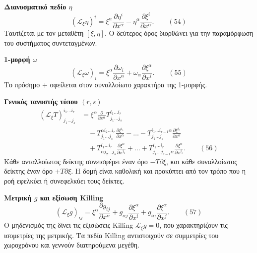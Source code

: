 \documentclass[12pt]{article}
\begin{document}
\textbf{Διανυσματικό πεδίο $\eta$}
\begin{equation}
(\mathcal{L}_\xi \eta)^i = \xi^\alpha \frac{\partial \eta^i}{\partial x^\alpha} - \eta^\alpha \frac{\partial \xi^i}{\partial x^\alpha}. \qquad (54)
\end{equation}
Ταυτίζεται με τον μεταθέτη $[\xi, \eta]$. Ο δεύτερος όρος διορθώνει για την παραμόρφωση του συστήματος συντεταγμένων.

\textbf{1-μορφή $\omega$}
\begin{equation}
(\mathcal{L}_\xi \omega)_i = \xi^\alpha \frac{\partial \omega_i}{\partial x^\alpha} + \omega_\alpha \frac{\partial \xi^\alpha}{\partial x^i}. \qquad (55)
\end{equation}
Το πρόσημο $+$ οφείλεται στον συναλλοίωτο χαρακτήρα της 1-μορφής.

\textbf{Γενικός τανυστής τύπου $(r, s)$}
\begin{equation}
\begin{aligned}
(\mathcal{L}_\xi T)^{i_1 \dots i_r}_{j_1 \dots j_s} &= \xi^\alpha \frac{\partial}{\partial x^\alpha} T^{i_1 \dots i_r}_{j_1 \dots j_s} \\
&\quad - T^{\alpha i_2 \dots i_r}_{j_1 \dots j_s} \frac{\partial \xi^{i_1}}{\partial x^\alpha} - \dots - T^{i_1 \dots i_{r-1} \alpha}_{j_1 \dots j_s} \frac{\partial \xi^{i_r}}{\partial x^\alpha} \\
&\quad + T^{i_1 \dots i_r}_{\alpha j_2 \dots j_s} \frac{\partial \xi^\alpha}{\partial x^{j_1}} + \dots + T^{i_1 \dots i_r}_{j_1 \dots j_{s-1} \alpha} \frac{\partial \xi^\alpha}{\partial x^{j_s}}. \qquad (56)
\end{aligned}
\end{equation}
Κάθε ανταλλοίωτος δείκτης συνεισφέρει έναν όρο $-T \partial \xi$, και κάθε συναλλοίωτος δείκτης έναν όρο $+T \partial \xi$. Η δομή είναι καθολική και προκύπτει από τον τρόπο που η ροή εφελκύει ή συνεφελκύει τους δείκτες.

\textbf{Μετρική $g$ και εξίσωση Killing}
\begin{equation}
(\mathcal{L}_\xi g)_{ij} = \xi^\alpha \frac{\partial g_{ij}}{\partial x^\alpha} + g_{\alpha j} \frac{\partial \xi^\alpha}{\partial x^i} + g_{i\alpha} \frac{\partial \xi^\alpha}{\partial x^j}. \qquad (57)
\end{equation}
Ο μηδενισμός της δίνει τις εξισώσεις Killing $\mathcal{L}_\xi g = 0$, που χαρακτηρίζουν τις ισομετρίες της μετρικής. Τα πεδία Killing αντιστοιχούν σε συμμετρίες του χωροχρόνου και γεννούν διατηρούμενα μεγέθη.
\end{document}
